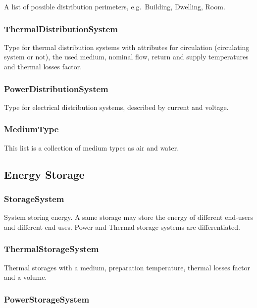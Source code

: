 \documentclass[a4paper,12pt]{article}
\begin{document}
A list of possible distribution perimeters, e.g.~Building, Dwelling,
Room.

\subsubsection{ThermalDistributionSystem}\label{thermaldistributionsystem}

Type for thermal distribution systems with attributes for circulation
(circulating system or not), the used medium, nominal flow, return and
supply temperatures and thermal losses factor.

\subsubsection{PowerDistributionSystem}\label{powerdistributionsystem}

Type for electrical distribution systems, described by current and
voltage.

\subsubsection{MediumType}\label{mediumtype}

This list is a collection of medium types as air and water.

\subsection{Energy Storage}\label{energy-storage}

\subsubsection{StorageSystem}\label{storagesystem}

System storing energy. A same storage may store the energy of different
end-users and different end uses. Power and Thermal storage systems are
differentiated.

\subsubsection{ThermalStorageSystem}\label{thermalstoragesystem}

Thermal storages with a medium, preparation temperature, thermal losses
factor and a volume.

\subsubsection{PowerStorageSystem}\label{powerstoragesystem}
\end{document}

